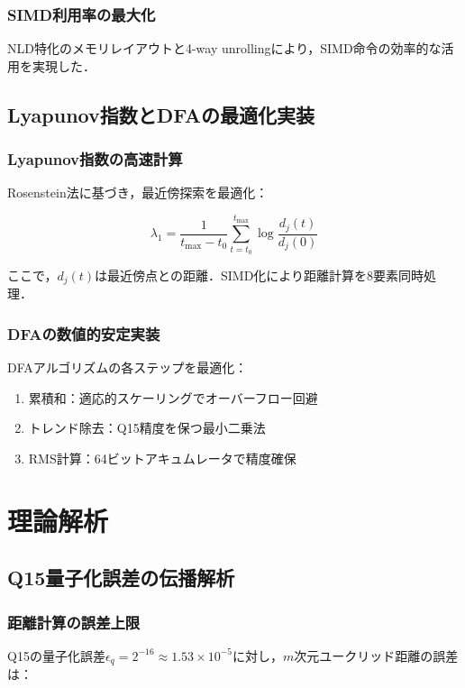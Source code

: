 \documentclass[paper]{ieice}
\begin{document}
\subsubsection{SIMD利用率の最大化}
NLD特化のメモリレイアウトと4-way unrollingにより，SIMD命令の効率的な活用を実現した．

\subsection{Lyapunov指数とDFAの最適化実装}

\subsubsection{Lyapunov指数の高速計算}
Rosenstein法\cite{rosenstein1993}に基づき，最近傍探索を最適化：

\begin{equation}
\lambda_1 = \frac{1}{t_{\max} - t_0} \sum_{t=t_0}^{t_{\max}} \log \frac{d_j(t)}{d_j(0)}
\end{equation}

ここで，$d_j(t)$は最近傍点との距離．SIMD化により距離計算を8要素同時処理．

\subsubsection{DFAの数値的安定実装}
DFAアルゴリズムの各ステップを最適化：

\begin{enumerate}
\item 累積和：適応的スケーリングでオーバーフロー回避
\item トレンド除去：Q15精度を保つ最小二乗法
\item RMS計算：64ビットアキュムレータで精度確保
\end{enumerate}


\section{理論解析}

\subsection{Q15量子化誤差の伝播解析}

\subsubsection{距離計算の誤差上限}
Q15の量子化誤差$\epsilon_q = 2^{-16} \approx 1.53 \times 10^{-5}$に対し，$m$次元ユークリッド距離の誤差は：
\end{document}
